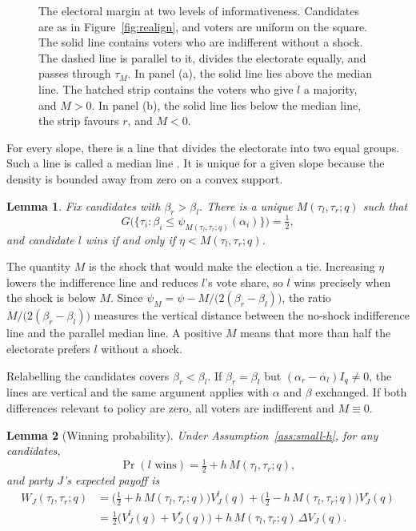 \documentclass[12pt,letterpaper]{article}
\newtheorem{lemma}{Lemma}
\begin{document}
\begin{figure}[tbp]
\begin{minipage}[b]{0.49\linewidth}
\end{minipage}
\caption{The electoral margin at two levels of informativeness. Candidates are as in Figure~\ref{fig:realign}, and voters are uniform on the square. The solid line contains voters who are indifferent without a shock. The dashed line is parallel to it, divides the electorate equally, and passes through $\tau_M$. In panel (a), the solid line lies above the median line. The hatched strip contains the voters who give $l$ a majority, and $M>0$. In panel (b), the solid line lies below the median line, the strip favours $r$, and $M<0$.}
\label{fig:median}
\end{figure}

For every slope, there is a line that divides the electorate into two equal groups. Such a line is called a median line \citep{DavisDeGrootHinich1972,McKelvey1986}. It is unique for a given slope because the density is bounded away from zero on a convex support.

\begin{lemma}\label{lem:median}
Fix candidates with $\beta_r>\beta_l$. There is a unique $M(\tau_l,\tau_r;q)$ such that
\[
G\big(\{\tau_i:\beta_i\le\psi_{M(\tau_l,\tau_r;q)}(\alpha_i)\}\big)=\tfrac12 ,
\]
and candidate $l$ wins if and only if $\eta<M(\tau_l,\tau_r;q)$.
\end{lemma}

The quantity $M$ is the shock that would make the election a tie. Increasing $\eta$ lowers the indifference line and reduces $l$'s vote share, so $l$ wins precisely when the shock is below $M$. Since $\psi_M=\psi-M/\big(2(\beta_r-\beta_l)\big)$, the ratio $M/\big(2(\beta_r-\beta_l)\big)$ measures the vertical distance between the no-shock indifference line and the parallel median line. A positive $M$ means that more than half the electorate prefers $l$ without a shock.

Relabelling the candidates covers $\beta_r<\beta_l$. If $\beta_r=\beta_l$ but $(\alpha_r-\alpha_l)I_q\ne0$, the lines are vertical and the same argument applies with $\alpha$ and $\beta$ exchanged. If both differences relevant to policy are zero, all voters are indifferent and $M\equiv0$.

\begin{lemma}[Winning probability]\label{lem:win}
Under Assumption~\ref{ass:small-h}, for any candidates,
\[
\Pr(l\text{ wins})=\tfrac12+h\,M(\tau_l,\tau_r;q),
\]
and party $J$'s expected payoff is
\begin{align*}
W_J(\tau_l,\tau_r;q)
&=\Big(\tfrac12+h\,M(\tau_l,\tau_r;q)\Big)V_J^l(q)+\Big(\tfrac12-h\,M(\tau_l,\tau_r;q)\Big)V_J^r(q)\\
&=\tfrac12\big(V_J^l(q)+V_J^r(q)\big)+h\,M(\tau_l,\tau_r;q)\,\Delta V_J(q).
\end{align*}
\end{lemma}
\end{document}
